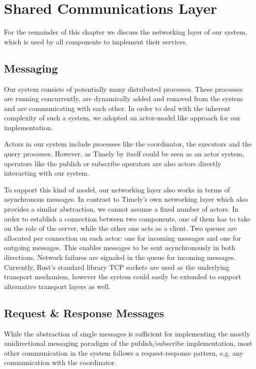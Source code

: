 \section{Shared Communications Layer}

For the remainder of this chapter we discuss the networking layer of our system,
which is used by all components to implement their services.

\subsection{Messaging}

Our system consists of potentially many distributed processes. These processes
are running concurrently, are dynamically added and removed from the system
and are communicating with each other. In order to deal with the inherent
complexity of such a system, we adopted an actor-model like approach for our
implementation.


Actors in our system include processes like the coordinator, the executors 
and the query processes. However, as Timely by itself could be seen as an
actor system, operators like the publish or subscribe operators are also actors
directly interacting with our system.

To support this kind of model, our networking layer also works in terms of
asynchronous messages. In contrast to Timely's own networking layer which also
provides a similar abstraction, we cannot assume a fixed number of actors.
In order to establish a connection between two components, one of them has to
take on the role of the server, while the other one acts as a client. Two
queues are allocated per connection on each actor: one for incoming messages
and one for outgoing messages. This enables messages to be sent asynchronously
in both directions. Network failures are signaled in the queue for incoming
messages. Currently, Rust's standard library TCP sockets are used as the
underlying transport mechanism, however the system could easily be extended to
support alternative transport layers as well.

\subsection{Request \& Response Messages} \label{sec:reqresp}

While the abstraction of single messages is sufficient for implementing the
mostly unidirectional messaging paradigm of the publish/subscribe implementation,
most other communication in the system follows a request-response pattern,
e.g. any communication with the coordinator.

